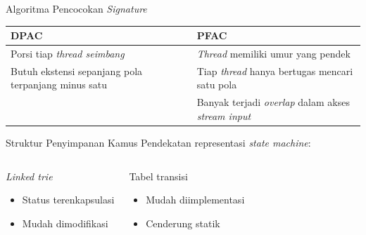 \documentclass[10pt]{beamer}
\begin{document}
\begin{frame}{Algoritma Pencocokan \emph{Signature}}
    \begin{table}
    \begin{tabular}{@{} p{5cm}p{5cm} @{}}
        \toprule
        DPAC & PFAC\\
        \midrule
        Porsi tiap \emph{thread seimbang} & \emph{Thread} memiliki umur yang pendek \\
        Butuh ekstensi sepanjang pola terpanjang minus satu & Tiap \emph{thread} hanya bertugas mencari satu pola\\
         & Banyak terjadi \emph{overlap} dalam akses \emph{stream input}\\
        \bottomrule
    \end{tabular}
    \end{table}
\end{frame}

\begin{frame}{Struktur Penyimpanan Kamus}
    Pendekatan representasi \emph{state machine}:
    \begin{columns}[T,onlytextwidth]

          \begin{block}{\emph{Linked trie}}
            \begin{itemize}
                \item Status terenkapsulasi
                \item Mudah dimodifikasi
            \end{itemize}
          \end{block}
    
    
          \begin{block}{Tabel transisi}
            \begin{itemize}
                \item Mudah diimplementasi
                \item Cenderung statik
            \end{itemize}
          \end{block}
    
    \end{columns}
\end{frame}
\end{document}
